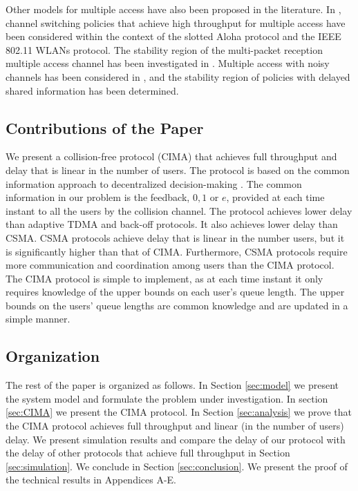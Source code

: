 \documentclass[onecolumn,draftcls]{IEEEtran}
\newcommand{\g}{\text{CIMA}}
\begin{document}
Other models for multiple access have also been proposed in the literature.
In \cite{wang2014optimal}, channel switching policies that achieve high throughput for multiple access have been considered within the context of the slotted Aloha protocol and the IEEE 802.11 WLANs protocol.
The stability region of the multi-packet reception multiple access channel has been investigated in \cite{luo2006throughput}.
Multiple access with noisy channels has been considered in \cite{ying2011throughput, reddy2012distributed}, and the stability region of policies with delayed shared information has been determined.







\subsection*{Contributions of the Paper}
We present a collision-free protocol ($\g$) that achieves full throughput and delay that is linear in the number of users.
The protocol is based on the common information approach to decentralized decision-making \cite{nayyar2013decentralized}.
The common information in our problem is the feedback, $0,1$ or $e$, provided at each time instant to all the users by the collision channel. The protocol achieves lower delay than adaptive TDMA and back-off protocols. It also achieves lower delay than CSMA. CSMA protocols achieve delay that is linear in the number users, but it is significantly higher than that of $\g$. Furthermore, CSMA protocols require more communication and coordination among users than the $\g$ protocol.
The $\g$ protocol is simple to implement, as at each time instant it only requires knowledge of the upper bounds on each user's queue length. The upper bounds on the users' queue lengths are common knowledge and are updated in a simple manner.


\subsection*{Organization}
The rest of the paper is organized as follows. In Section \ref{sec:model} we present the system model and formulate the problem under investigation. In section \ref{sec:CIMA} we present the $\g$ protocol.
In Section \ref{sec:analysis} we prove that the $\g$ protocol achieves full throughput and linear (in the number of users) delay.
We present simulation results and compare the delay of our protocol with the delay of other 
protocols that achieve full throughput in Section \ref{sec:simulation}.
We conclude in Section \ref{sec:conclusion}.
We present the proof of the technical results in Appendices A-E.
\end{document}
